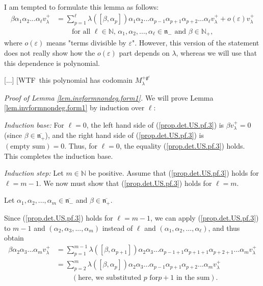 \documentclass
[numbers=enddot,12pt,final,onecolumn,german,notitlepage]{scrartcl}%
\theoremstyle{definition}
\begin{document}
I am tempted to formulate this lemma as follows:%
\begin{align*}
\beta\alpha_{1}\alpha_{2}...\alpha_{\ell}v_{\lambda}^{+}  &  =\sum
\limits_{p=1}^{\ell}\lambda\left(  \left[  \beta,\alpha_{p}\right]  \right)
\alpha_{1}\alpha_{2}...\alpha_{p-1}\alpha_{p+1}\alpha_{p+2}...\alpha_{\ell
}v_{\lambda}^{+}+o\left(  \varepsilon\right)  v_{\lambda}^{+}\\
&  \ \ \ \ \ \ \ \ \ \ \text{for all }\ell\in\mathbb{N}\text{, }\alpha
_{1},\alpha_{2},...,\alpha_{\ell}\in\mathfrak{n}_{-}\text{ and }\beta
\in\mathbb{N}_{+},
\end{align*}
where $o\left(  \varepsilon\right)  $ means "terms divisible by $\varepsilon
$". However, this version of the statement does not really show how the
$o\left(  \varepsilon\right)  $ part depends on $\lambda$, whereas we will use
that this dependence is polynomial.

[...] [WTF\ this polynomial has codomain $M_{\lambda}^{+\mathfrak{g}%
^{\varepsilon}}$

\textit{Proof of Lemma \ref{lem.invformnondeg.form1}.} We will prove Lemma
\ref{lem.invformnondeg.form1} by induction over $\ell$:

\textit{Induction base:} For $\ell=0$, the left hand side of
(\ref{prop.det.US.pf.3}) is $\beta v_{\lambda}^{+}=0$ (since $\beta
\in\overline{\mathfrak{n}_{+}}$), and the right hand side of
(\ref{prop.det.US.pf.3}) is $\left(  \text{empty sum}\right)  =0$. Thus, for
$\ell=0$, the equality (\ref{prop.det.US.pf.3}) holds. This completes the
induction base.

\textit{Induction step:} Let $m\in\mathbb{N}$ be positive. Assume that
(\ref{prop.det.US.pf.3}) holds for $\ell=m-1$. We now must show that
(\ref{prop.det.US.pf.3}) holds for $\ell=m$.

Let $\alpha_{1},\alpha_{2},...,\alpha_{m}\in\overline{\mathfrak{n}_{-}}$ and
$\beta\in\overline{\mathfrak{n}_{+}}$.

Since (\ref{prop.det.US.pf.3}) holds for $\ell=m-1$, we can apply
(\ref{prop.det.US.pf.3}) to $m-1$ and $\left(  \alpha_{2},\alpha
_{3},...,\alpha_{m}\right)  $ instead of $\ell$ and $\left(  \alpha_{1}%
,\alpha_{2},...,\alpha_{\ell}\right)  $, and thus obtain%
\begin{align*}
\beta\alpha_{2}\alpha_{3}...\alpha_{m}v_{\lambda}^{+}  &  =\sum\limits_{p=1}%
^{m-1}\lambda\left(  \left[  \beta,\alpha_{p+1}\right]  \right)  \alpha
_{2}\alpha_{3}...\alpha_{p-1+1}\alpha_{p+1+1}\alpha_{p+2+1}...\alpha
_{m}v_{\lambda}^{+}\\
&  =\sum\limits_{p=2}^{m}\lambda\left(  \left[  \beta,\alpha_{p}\right]
\right)  \alpha_{2}\alpha_{3}...\alpha_{p-1}\alpha_{p+1}\alpha_{p+2}%
...\alpha_{m}v_{\lambda}^{+}\\
&  \ \ \ \ \ \ \ \ \ \ \left(  \text{here, we substituted }p\text{ for
}p+1\text{ in the sum}\right)  .
\end{align*}
\end{document}
